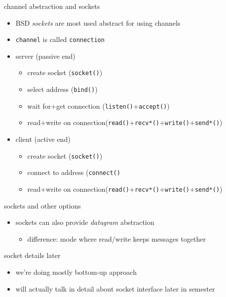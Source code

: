 \begin{frame}{channel abstraction and sockets}
    \begin{itemize}
    \item BSD \textit{sockets} are most used abstract for using channels
    \item \texttt{channel} is called \texttt{connection}
    \vspace{.5cm}
    \item server (passive end)
        \begin{itemize}
        \item create socket (\texttt{socket()})
        \item select address (\texttt{bind()})
        \item wait for+get connection (\texttt{listen()}+\texttt{accept()})
        \item read+write on connection(\texttt{read()}+\texttt{recv*()}+\texttt{write()}+\texttt{send*()})
        \end{itemize}
    \item client (active end)
        \begin{itemize}
        \item create socket (\texttt{socket()})
        \item connect to address (\texttt{connect()}
        \item read+write on connection(\texttt{read()}+\texttt{recv*()}+\texttt{write()}+\texttt{send*()})
        \end{itemize}
    \end{itemize}
\end{frame}

\begin{frame}{sockets and other options}
    \begin{itemize}
    \item sockets can also provide \textit{datagram} abstraction
        \begin{itemize}
        \item difference: mode where read/write keeps messages together
        \end{itemize}
    \end{itemize}
\end{frame}

\begin{frame}{socket details later}
    \begin{itemize}
    \item we're doing mostly bottom-up approach
    \item will actually talk in detail about socket interface later in semester
    \end{itemize}
\end{frame}
